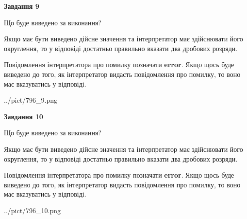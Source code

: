 \documentclass[12pt, ukrainian]{article}
\begin{document}
{\begin {Large}
{\begin {center}\textbf{Завдання 9}\end {center}}\par
Що буде виведено за виконання? \par

Якщо має бути виведено дійсне значення та інтерпретатор має здійснювати його округлення, 
то у відповіді достатньо правильно вказати два дробових розряди.

Повідомлення інтерпретатора про помилку позначати \textbf{error}.
Якщо щось буде виведено до того, як інтерпретатор видасть повідомлення про помилку, 
то воно має вказуватись у відповіді. \par

\begin{center}
	{../pict/796_9.png}
\end{center}
\newpage

{\begin {center}\textbf{Завдання 10}\end {center}}\par
Що буде виведено за виконання? \par

Якщо має бути виведено дійсне значення та інтерпретатор має здійснювати його округлення, 
то у відповіді достатньо правильно вказати два дробових розряди.

Повідомлення інтерпретатора про помилку позначати \textbf{error}.
Якщо щось буде виведено до того, як інтерпретатор видасть повідомлення про помилку, 
то воно має вказуватись у відповіді. \par

\begin{center}
	{../pict/796_10.png}
\end{center}
\newpage

\end {Large}}
\end{document}
